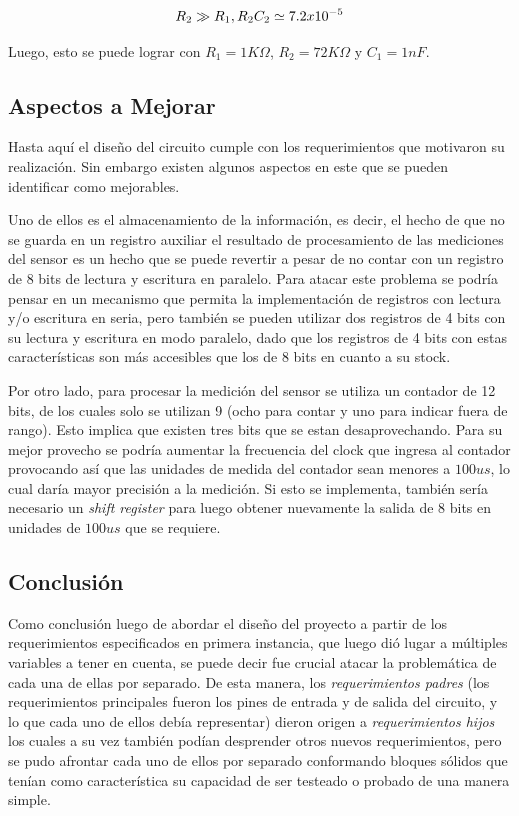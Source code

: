 \[
    R_{2}\gg R_{1},\\
    R_{2}C_{2}\simeq7.2x10^{-5}
\]

\vspace{5mm}
Luego, esto se puede lograr con $R_{1}=1K\varOmega$, $R_{2}=72K\varOmega$
y $C_{1}=1nF$.

\subsection{Aspectos a Mejorar}

Hasta aquí el diseño del circuito cumple con los requerimientos que
motivaron su realización. Sin embargo existen algunos aspectos en
este que se pueden identificar como mejorables.

Uno de ellos es el almacenamiento de la información, es decir, el
hecho de que no se guarda en un registro auxiliar el resultado de
procesamiento de las mediciones del sensor es un hecho que se puede
revertir a pesar de no contar con un registro de 8 bits de lectura
y escritura en paralelo. Para atacar este problema se podría pensar
en un mecanismo que permita la implementación de registros con lectura
y/o escritura en seria, pero también se pueden utilizar dos registros
de 4 bits con su lectura y escritura en modo paralelo, dado que los
registros de 4 bits con estas características son más accesibles que
los de 8 bits en cuanto a su stock.

Por otro lado, para procesar la medición del sensor se utiliza un
contador de 12 bits, de los cuales solo se utilizan 9 (ocho para contar
y uno para indicar fuera de rango). Esto implica que existen tres
bits que se estan desaprovechando. Para su mejor provecho se podría
aumentar la frecuencia del clock que ingresa al contador provocando
así que las unidades de medida del contador sean menores a $100us$,
lo cual daría mayor precisión a la medición. Si esto se implementa,
también sería necesario un \textit{shift register} para luego obtener
nuevamente la salida de 8 bits en unidades de $100us$ que se requiere.

\subsection{Conclusión}

Como conclusión luego de abordar el diseño del proyecto a partir de
los requerimientos especificados en primera instancia, que luego dió
lugar a múltiples variables a tener en cuenta, se puede decir fue
crucial atacar la problemática de cada una de ellas por separado.
De esta manera, los \textit{requerimientos padres} (los requerimientos
principales fueron los pines de entrada y de salida del circuito,
y lo que cada uno de ellos debía representar) dieron origen a \textit{requerimientos
hijos} los cuales a su vez también podían desprender otros nuevos
requerimientos, pero se pudo afrontar cada uno de ellos por separado
conformando bloques sólidos que tenían como característica su capacidad
de ser testeado o probado de una manera simple.


